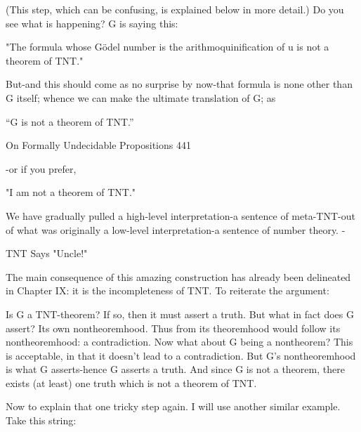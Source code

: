 (This step, which can be confusing, is explained below in more detail.) Do you see what
is happening? G is saying this:

       "The formula whose Gödel number is the arithmoquinification
       of u is not a theorem of TNT."

But-and this should come as no surprise by now-that formula is none other than G itself;
whence we can make the ultimate translation of G; as

                              “G is not a theorem of TNT.”


On Formally Undecidable Propositions                                                  441

-or if you prefer,

                              "I am not a theorem of TNT."

We have gradually pulled a high-level interpretation-a sentence of meta-TNT-out of what
was originally a low-level interpretation-a sentence of number theory.   -

                                   TNT Says "Uncle!"

The main consequence of this amazing construction has already been delineated in
Chapter IX: it is the incompleteness of TNT. To reiterate the argument:

   Is G a TNT-theorem? If so, then it must assert a truth. But what in fact does G
   assert? Its own nontheoremhood. Thus from its theoremhood would follow its
   nontheoremhood: a contradiction.
            Now what about G being a nontheorem? This is acceptable, in that it doesn't
   lead to a contradiction. But G's nontheoremhood is what G asserts-hence G asserts
   a truth. And since G is not a theorem, there exists (at least) one truth which is not a
   theorem of TNT.

   Now to explain that one tricky step again. I will use another similar example. Take this
   string:

